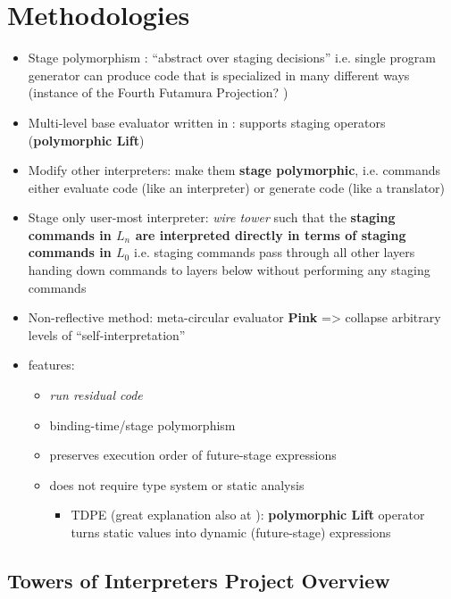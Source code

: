 \documentclass{article}
\begin{document}
\section{Methodologies}
\begin{itemize}
	\item Stage polymorphism \cite{ofenbeck2017staging}: ``abstract over staging decisions'' i.e. single program generator can produce code that is specialized in many different ways (instance of the Fourth Futamura Projection? \cite{gluck2009there}) 
	\item Multi-level base evaluator written in \mslang: supports staging operators (\textbf{polymorphic Lift})
	\item Modify other interpreters: make them \textbf{stage polymorphic}, i.e. commands either evaluate code (like an interpreter) or generate code (like a translator)
	\item Stage only user-most interpreter: \textit{wire tower} such that the \textbf{staging commands in $L_{n}$ are interpreted directly in terms of staging commands in $L_{0}$} i.e. staging commands pass through all other layers handing down commands to layers below without performing any staging commands
	\item Non-reflective method: meta-circular evaluator \textbf{Pink} => collapse arbitrary levels of ``self-interpretation''
	\item \mslang features:
	\begin{itemize}
		\item \textit{run residual code}
		\item binding-time/stage polymorphism \cite{henglein1994polymorphic}
		\item preserves execution order of future-stage expressions
		\item does not require type system or static analysis
		\begin{itemize}
			\item TDPE \cite{danvy1999type} (great explanation also at \cite{grobauer2001second}): \textbf{polymorphic Lift} operator turns static values into dynamic (future-stage) expressions
		\end{itemize}
	\end{itemize}
\end{itemize}

\subsection{Towers of Interpreters Project Overview}
\end{document}
